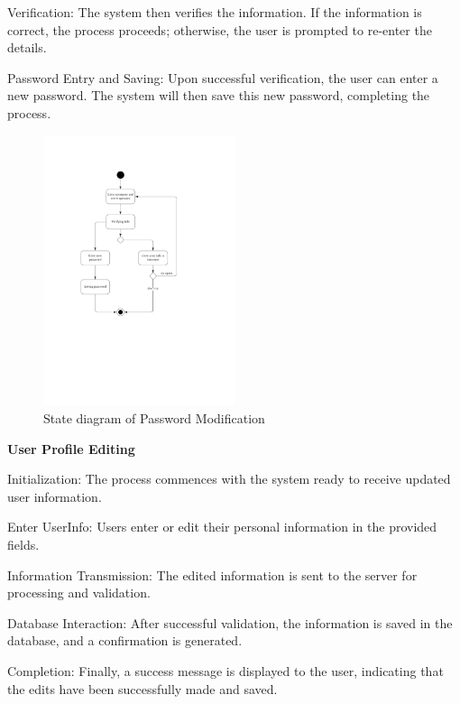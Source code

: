 \documentclass[conference]{IEEEtran}
\begin{document}
Verification: The system then verifies the information. If the information is correct, the process proceeds; otherwise, the user is prompted to re-enter the details.

Password Entry and Saving: Upon successful verification, the user can enter a new password. The system will then save this new password, completing the process.

\begin{figure}[htbp]
	\centerline{\includegraphics[width=0.5\textwidth]{Diagram_of_Editing_Info_and_Password/State_diagram_of_changing_psw.pdf}}
	\caption{State diagram of Password Modification }
	\label{State_diagram_of_changing_psw}
\end{figure}
\textbf{ User Profile Editing}

Initialization: The process commences with the system ready to receive updated user information.

Enter UserInfo: Users enter or edit their personal information in the provided fields.

Information Transmission: The edited information is sent to the server for processing and validation.

Database Interaction: After successful validation, the information is saved in the database, and a confirmation is generated.

Completion: Finally, a success message is displayed to the user, indicating that the edits have been successfully made and saved.
\end{document}
